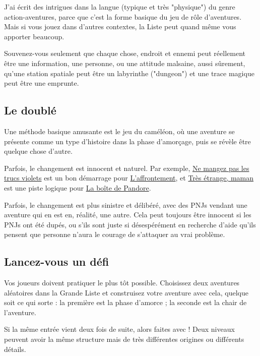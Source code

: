 \begin{multicols}{2}
J'ai écrit des intrigues dans la langue (typique et très "physique") du genre action-aventures, parce que c'est la forme basique du jeu de rôle d'aventures. Mais si vous jouez dans d'autres contextes, la Liste peut quand même vous apporter beaucoup.

Souvenez-vous seulement que chaque chose, endroit et ennemi peut réellement être une information, une personne, ou une attitude malsaine, aussi sûrement, qu'une station spatiale peut être un labyrinthe ("dungeon") et une trace magique peut être une emprunte.

\subsection*{Le doublé}
\hypertarget{double1}{}

Une méthode basique amusante est le jeu du caméléon, où une aventure se présente comme un type d'histoire dans la phase d'amorçage, puis se révèle être quelque chose d'autre.

Parfois, le changement est innocent et naturel. Par exemple, \hyperlink{violet}{Ne mangez pas les trucs violets} est un bon démarrage pour \hyperlink{affrontement}{L'affrontement}, et \hyperlink{etrange}{Très étrange, maman} est une piste logique pour \hyperlink{pandore}{La boîte de Pandore}.

Parfois, le changement est plus sinistre et délibéré, avec des PNJs vendant une aventure qui en est en, réalité, une autre. Cela peut toujours être innocent si les PNJs ont été dupés, ou s'ils sont juste si désespérément en recherche d'aide qu'ils pensent que personne n'aura le courage de s'attaquer au vrai problème.

\subsection*{Lancez-vous un défi}
\hypertarget{defi}{}


Vos joueurs doivent pratiquer le plus tôt possible. Choisissez deux aventures aléatoires dans la Grande Liste et construisez votre aventure avec cela, quelque soit ce qui sorte : la première est la phase d'amorce ; la seconde est la chair de l'aventure.

Si la même entrée vient deux fois de suite, alors faites avec ! Deux niveaux peuvent avoir la même structure mais de très différentes origines ou différents détails.


\end{multicols}
